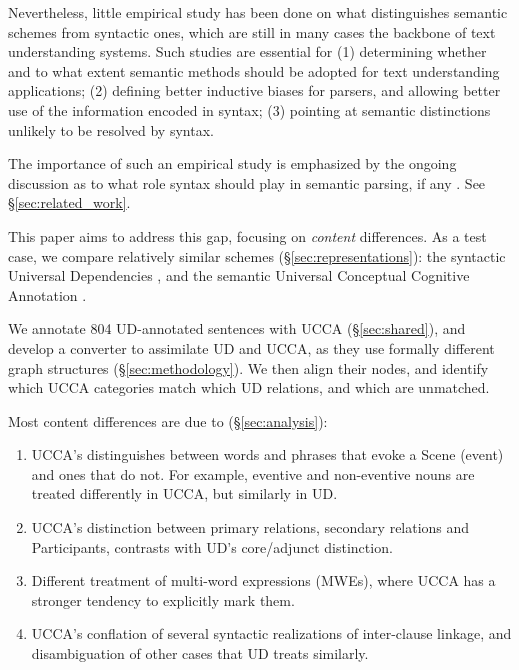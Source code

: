 \documentclass[11pt,a4paper]{article}
\begin{document}
  Nevertheless, little empirical study has been done on what distinguishes semantic schemes from
  syntactic ones, which are still in many cases the backbone of text understanding systems. 
  Such studies are essential for 
  (1) determining whether and to what extent semantic methods should be adopted for text understanding applications;
  (2) defining better inductive biases for parsers, and allowing better use of the information encoded in syntax;
  (3) pointing at semantic distinctions unlikely to be resolved by syntax.

  The importance of such an empirical study is emphasized by the ongoing discussion as to what role syntax should
  play in semantic parsing, if any \cite{swayamdipta2018syntactic,strubell2018linguistically,P18-1192,C18-1233}.
  See \S\ref{sec:related_work}.

  This paper aims to address this gap,
  focusing on {\it content} differences.
  As a test case, we compare relatively similar schemes (\S\ref{sec:representations}):
  the syntactic Universal Dependencies \cite[UD; ][]{nivre2016universal},
  and the semantic Universal Conceptual Cognitive Annotation \cite[UCCA; ][]{abend2013universal}.
  
  We annotate 804 UD-annotated sentences with UCCA (\S\ref{sec:shared}),
  and develop a converter to assimilate UD and UCCA,
  as they use formally different graph structures
  (\S\ref{sec:methodology}).
  We then align their nodes, and identify which UCCA categories match which UD relations,
  and which are unmatched.

  Most content differences are due to (\S\ref{sec:analysis}):
  \begin{enumerate}[noitemsep,leftmargin=*]
      \item UCCA's distinguishes between words and phrases that evoke a Scene (event) and ones that do not.
        For example, eventive and non-eventive nouns are treated differently in UCCA, but similarly in UD.
      \item UCCA's distinction between primary relations, secondary relations
        and Participants, contrasts with UD's core/adjunct distinction. %
      \item Different treatment of multi-word expressions (MWEs),
        where UCCA has a stronger tendency to explicitly mark them. %
      \item UCCA's conflation of several syntactic realizations of inter-clause linkage,
        and disambiguation of other cases that UD treats similarly.
   \end{enumerate}
\end{document}
